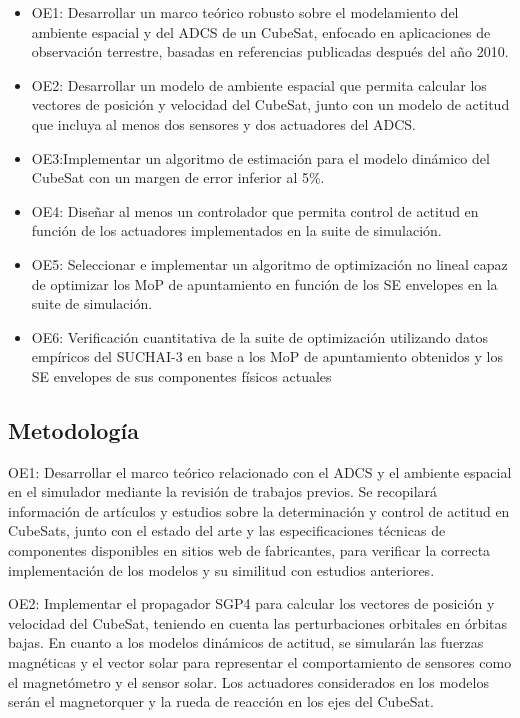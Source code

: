 \begin{itemize}
	\item OE1: Desarrollar un marco teórico robusto sobre el modelamiento del ambiente espacial y del ADCS de un CubeSat, enfocado en aplicaciones de observación terrestre, basadas en referencias publicadas después del año 2010.
	\item OE2: Desarrollar un modelo de ambiente espacial que permita calcular los vectores de posición y velocidad del CubeSat, junto con un modelo de actitud que incluya al menos dos sensores y dos actuadores del ADCS.
	\item OE3:Implementar un algoritmo de estimación para el modelo dinámico del CubeSat con un margen de error inferior al 5\%.
	\item OE4: Diseñar al menos un  controlador que permita control de actitud en función de los actuadores implementados en la suite de simulación.
	\item OE5: Seleccionar e implementar un algoritmo de optimización no lineal capaz de optimizar los MoP de apuntamiento en función de los SE envelopes en la suite de simulación.
	\item OE6: Verificación cuantitativa de la suite de optimización utilizando datos empíricos del SUCHAI-3 en base a los MoP de apuntamiento obtenidos y los SE envelopes de sus componentes físicos actuales
\end{itemize}




\subsection{Metodología}

OE1: Desarrollar el marco teórico relacionado con el ADCS y el ambiente espacial en el simulador mediante la revisión de trabajos previos. Se recopilará información de artículos y estudios sobre la determinación y control de actitud en CubeSats, junto con el estado del arte y las especificaciones técnicas de componentes disponibles en sitios web de fabricantes, para verificar la correcta implementación de los modelos y su similitud con estudios anteriores.

OE2: Implementar el propagador SGP4 para calcular los vectores de posición y velocidad del CubeSat, teniendo en cuenta las perturbaciones orbitales en órbitas bajas. En cuanto a los modelos dinámicos de actitud, se simularán las fuerzas magnéticas y el vector solar para representar el comportamiento de sensores como el magnetómetro y el sensor solar. Los actuadores considerados en los modelos serán el magnetorquer y la rueda de reacción en los ejes del CubeSat.

